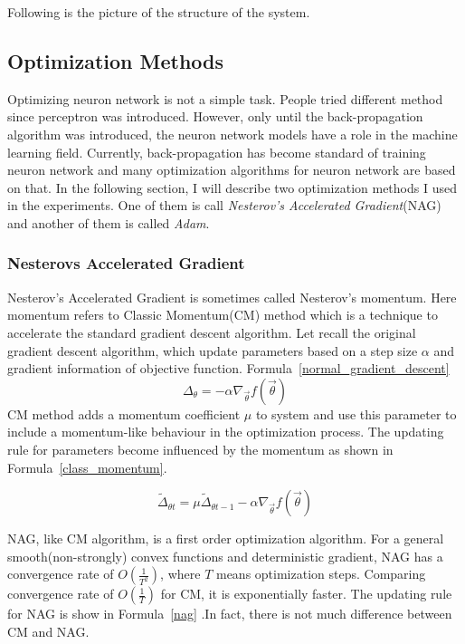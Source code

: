 \documentclass[officiallayout]{tktla}
\begin{document}
Following is the picture of the structure of the system. 

\subsection{Optimization Methods}

Optimizing neuron network is not a simple task. People tried different method since perceptron was introduced. However, only until the back-propagation algorithm was introduced, the neuron network models have a role in the machine learning field. Currently, back-propagation has become standard of training neuron network and many optimization algorithms for neuron network are based on that. In the following section, I will describe two optimization methods I used in the experiments. One of them is call \textit{Nesterov's Accelerated Gradient}(NAG) and another of them is called \textit{Adam}. 
\subsubsection{Nesterovs Accelerated Gradient}
Nesterov's Accelerated Gradient is sometimes called Nesterov's momentum. Here momentum refers to Classic Momentum(CM) method which is a technique to accelerate the standard gradient descent algorithm. Let recall the original gradient descent algorithm, which update parameters based on a step size $\alpha$ and gradient information of objective function. Formula~\ref{normal_gradient_descent}
\begin{equation}
\Delta_\theta = -\alpha \nabla_{\vec{\theta}} f(\vec{\theta})
\label{normal_gradient_descent}
\end{equation}
CM method adds a momentum coefficient $\mu$ to system and use this parameter to include a momentum-like behaviour in the optimization process. The updating rule for parameters become influenced by the momentum as shown in Formula~\ref{class_momentum}.

\begin{equation}
\widetilde{\Delta}_{\theta t} =  \mu \widetilde{\Delta}_{\theta {t-1}}  -\alpha \nabla_{\vec{\theta}} f(\vec{\theta})
\label{class_momentum}
\end{equation}

NAG, like CM algorithm, is a first order optimization algorithm. For a general smooth(non-strongly) convex functions and deterministic gradient, NAG has a convergence rate of $O(\frac{1}{T^2})$, where $T$ means optimization steps. Comparing convergence rate of $O(\frac{1}{T})$ for CM, it is exponentially faster. The updating rule for NAG is show in Formula~\ref{nag} .In fact, there is not much difference between CM and NAG. 
\end{document}
